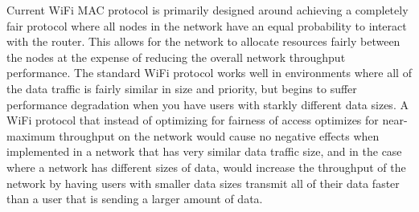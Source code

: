 \documentclass{sigcomm-alternate}
\begin{document}



%
%



Current WiFi MAC protocol is primarily designed around achieving a completely fair protocol where all nodes in the network have an equal probability to interact with the router. This allows for the network to allocate resources fairly between the nodes at the expense of reducing the overall network throughput performance. The standard WiFi protocol works well in environments where all of the data traffic is fairly similar in size and priority, but begins to suffer performance degradation when you have users with starkly different data sizes. A WiFi protocol that instead of optimizing for fairness of access optimizes for near-maximum throughput on the network would cause no negative effects when implemented in a network that has very similar data traffic size, and in the case where a network has different sizes of data, would increase the throughput of the network by having users with smaller data sizes transmit all of their data faster than a user that is sending a larger amount of data. 
\end{document}
